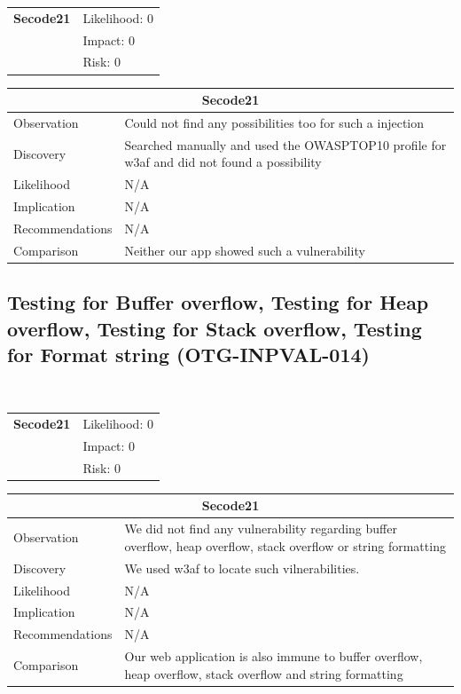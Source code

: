 \documentclass[headsepline,footsepline,footinclude=false,oneside,fontsize=11pt,paper=a4,listof=totoc,bibliography=totoc]{scrbook} %
\begin{document}
\begin{tabular}{cR{12cm}}
	\textbf{Secode21} & Likelihood: 0\\& Impact: 0\\& Risk: 0
\end{tabular}

\begin{tabular}{ l|p{11cm}  }
	\hline
	\multicolumn{2}{c}{\textbf{Secode21}} \\
	\hline
	Observation   & Could not find any possibilities too for such a injection\\
	Discovery  & Searched manually and used the OWASPTOP10 profile for w3af and did not found a possibility\\
	Likelihood & N/A \\
	Implication    & N/A \\
	Recommendations & N/A \\
	Comparison& Neither our app showed such a vulnerability\\
	\hline
\end{tabular}

\pagebreak
\subsection{Testing for Buffer overflow, Testing for Heap overflow, Testing for Stack overflow, Testing for Format string (OTG-INPVAL-014)}\

\begin{tabular}{cR{12cm}}
	\textbf{Secode21} & Likelihood: 0\\& Impact: 0\\& Risk: 0
\end{tabular}

\begin{tabular}{ l|p{11cm}  }
	\hline
	\multicolumn{2}{c}{\textbf{Secode21}} \\
	\hline
	Observation   & We did not find any vulnerability regarding buffer overflow,
	heap overflow, stack overflow or string formatting\\
	Discovery  & We used w3af to locate such vilnerabilities. \\
	Likelihood & N/A \\
	Implication    & N/A \\
	Recommendations & N/A \\
	Comparison& Our web application is also immune to buffer overflow,
	heap overflow, stack overflow and string formatting \\
	\hline
\end{tabular}
\end{document}
